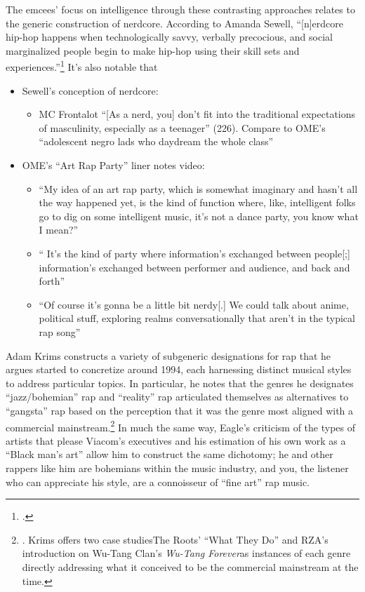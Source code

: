 The emcees' focus on intelligence through these contrasting approaches relates to the generic construction of
nerdcore. According to Amanda Sewell, ``[n]erdcore hip-hop happens when technologically savvy, verbally precocious,
and social marginalized people begin to make hip-hop using their skill sets and experiences.''\footnote{
    \autocite[223]{amandasewellNerdcoreHiphop2015}.}
It's also notable that
   
   \begin{itemize}
    \item Sewell's conception of nerdcore:
            \begin{itemize}
                \item MC Frontalot ``[As a nerd, you] don't fit into the traditional expectations of 
                masculinity, especially as a teenager'' (226). Compare to OME's ``adolescent negro lads who 
                daydream the whole class''
            \end{itemize}
        \item OME's ``Art Rap Party'' liner notes video:
            \begin{itemize}
                \item ``My idea of an art rap party, which is somewhat imaginary and hasn't all the way
                happened yet, is the kind of function where, like, intelligent folks go to dig on some
                intelligent music, \textellipsis it's not a dance party, you know what I mean?''
                \item ``  It's the kind of party where information's exchanged between people[;] 
                information's exchanged between performer and audience, and back and forth'' 
                \item ``Of course it's gonna be a little bit nerdy[.] \textellipsis We could talk about 
                anime, \textellipsis political stuff, exploring realms conversationally that aren't in the 
                typical rap song''
            \end{itemize}
    \end{itemize}

Adam Krims constructs a variety of subgeneric designations for rap that he argues started to concretize
around 1994, each harnessing distinct musical styles to address particular topics. In particular, he 
notes that the genres he designates ``jazz/bohemian'' rap and ``reality'' rap articulated themselves 
as alternatives  to ``gangsta'' rap based on the perception that it was the genre most aligned with
a commercial mainstream.\footnote{
    \autocite[64--65]{adamkrimsRapMusicPoetics2000}. Krims offers two case studies\textemdash The Roots' 
    ``What They Do'' and RZA's introduction on Wu-Tang Clan's \textit{Wu-Tang Forever}\textemdash as 
    instances of each genre directly addressing what it conceived to be the commercial mainstream at
    the time.}
In much the same way, Eagle's criticism of the types of artists that please Viacom's executives and his 
estimation of his own work as a ``Black man's art'' allow him to construct the same dichotomy; he and
other rappers like him are bohemians within the music industry, and you, the listener who can appreciate
his style, are a connoisseur of ``fine art'' rap music.

